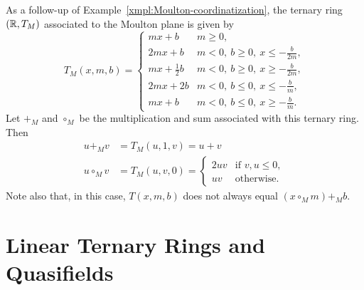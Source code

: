 
\begin{xmpl}\label{xmpl:Moulton-ternary-ring-defn}
    As a follow-up of Example~\ref{xmpl:Moulton-coordinatization}, the ternary ring $(\mathbb{R},T_M)$ associated to the Moulton plane is given by
    \[
        T_M(x,m,b) =
            \begin{cases}
                mx+b        &m\ge0,\\[1mm]
                2mx+b     &m<0,\ b\ge0,\ x\le-\frac b{2m},\\[1mm]
                mx+\frac12b   &m<0,\ b\ge0,\ x\ge-\frac b{2m},\\[1mm]
                2mx+2b    &m<0,\ b\le0,\ x\le-\frac bm,\\[1mm]
                mx+b      &m<0,\ b\le0,\ x\ge-\frac bm.
            \end{cases}
    \]
    Let $+_M$ and $\circ_M$ be the multiplication and sum associated with this ternary ring. Then
    \begin{align*}
        u+_Mv &= T_M(u,1,v)= u + v\\
        u\circ_Mv &= T_M(u,v,0)
        = \begin{cases}
            2uv     &\text{if }v,u\le0,\\
            uv      &\text{otherwise}.
        \end{cases}
    \end{align*}
    Note also that, in this case, $T(x,m,b)$ does not always equal $(x\circ_Mm)+_Mb$.
\end{xmpl}


\section{Linear Ternary Rings and Quasifields}

